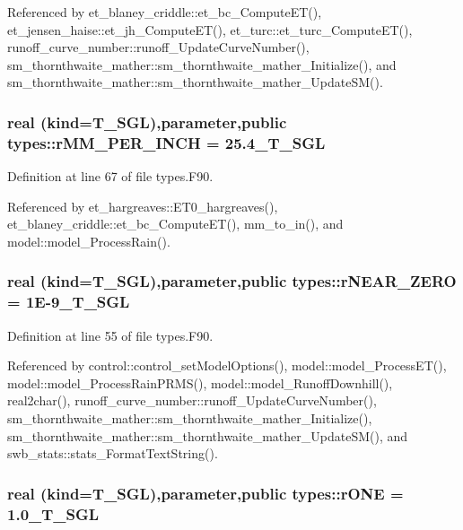 Referenced by et\_\-blaney\_\-criddle::et\_\-bc\_\-ComputeET(), et\_\-jensen\_\-haise::et\_\-jh\_\-ComputeET(), et\_\-turc::et\_\-turc\_\-ComputeET(), runoff\_\-curve\_\-number::runoff\_\-UpdateCurveNumber(), sm\_\-thornthwaite\_\-mather::sm\_\-thornthwaite\_\-mather\_\-Initialize(), and sm\_\-thornthwaite\_\-mather::sm\_\-thornthwaite\_\-mather\_\-UpdateSM().

\hypertarget{namespacetypes_ae91353f2b870e14fa790e351b8b3f865}{
\subsubsection[{rMM\_\-PER\_\-INCH}]{\setlength{\rightskip}{0pt plus 5cm}real (kind={\bf T\_\-SGL}),parameter,public {\bf types::rMM\_\-PER\_\-INCH} = 25.4\_\-T\_\-SGL}}
\label{namespacetypes_ae91353f2b870e14fa790e351b8b3f865}


Definition at line 67 of file types.F90.



Referenced by et\_\-hargreaves::ET0\_\-hargreaves(), et\_\-blaney\_\-criddle::et\_\-bc\_\-ComputeET(), mm\_\-to\_\-in(), and model::model\_\-ProcessRain().

\hypertarget{namespacetypes_a50c1fa61c229766c2a17cb7687703cdb}{
\subsubsection[{rNEAR\_\-ZERO}]{\setlength{\rightskip}{0pt plus 5cm}real (kind={\bf T\_\-SGL}),parameter,public {\bf types::rNEAR\_\-ZERO} = 1E-\/9\_\-T\_\-SGL}}
\label{namespacetypes_a50c1fa61c229766c2a17cb7687703cdb}


Definition at line 55 of file types.F90.



Referenced by control::control\_\-setModelOptions(), model::model\_\-ProcessET(), model::model\_\-ProcessRainPRMS(), model::model\_\-RunoffDownhill(), real2char(), runoff\_\-curve\_\-number::runoff\_\-UpdateCurveNumber(), sm\_\-thornthwaite\_\-mather::sm\_\-thornthwaite\_\-mather\_\-Initialize(), sm\_\-thornthwaite\_\-mather::sm\_\-thornthwaite\_\-mather\_\-UpdateSM(), and swb\_\-stats::stats\_\-FormatTextString().

\hypertarget{namespacetypes_a94afcebb08a1e89087d5ffb5a7585b72}{
\subsubsection[{rONE}]{\setlength{\rightskip}{0pt plus 5cm}real (kind={\bf T\_\-SGL}),parameter,public {\bf types::rONE} = 1.0\_\-T\_\-SGL}}
\label{namespacetypes_a94afcebb08a1e89087d5ffb5a7585b72}



